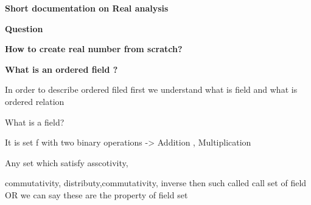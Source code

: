 \documentclass[12pt]{article}
\renewcommand{\_}{\kern-1.5pt\textunderscore\kern-1.5pt}
\begin{document}
\begin{Center}
{\fontsize{18pt}{21.6pt}\selectfont \textbf{Short documentation on Real analysis}\par}
\end{Center}\par


\vspace{\baselineskip}

\vspace{\baselineskip}

\vspace{\baselineskip}
\begin{FlushLeft}
{\fontsize{18pt}{21.6pt}\selectfont \textbf{Question }\par}
\end{FlushLeft}\par

\begin{FlushLeft}
{\fontsize{14pt}{16.8pt}\selectfont \textbf{How to create real number from scratch?}\par}
\end{FlushLeft}\par


\vspace{\baselineskip}
\begin{FlushLeft}
{\fontsize{18pt}{21.6pt}\selectfont \textbf{What is an ordered field ?}\par}
\end{FlushLeft}\par

\begin{FlushLeft}
{\fontsize{14pt}{16.8pt}\selectfont In order to describe ordered filed first we understand what is field and what is ordered relation\par}
\end{FlushLeft}\par


\vspace{\baselineskip}
\begin{FlushLeft}
What is a field?
\end{FlushLeft}\par


\vspace{\baselineskip}
\begin{FlushLeft}
It is set f with two binary operations -> Addition , Multiplication 
\end{FlushLeft}\par


\vspace{\baselineskip}
\begin{FlushLeft}
Any set which satisfy asscotivity, {\fontsize{10pt}{12.0pt}\selectfont commutativity, distributy,commutativity, inverse then such called call set of field OR we can say these are the property of field set\par}
\end{FlushLeft}\par
\end{document}
